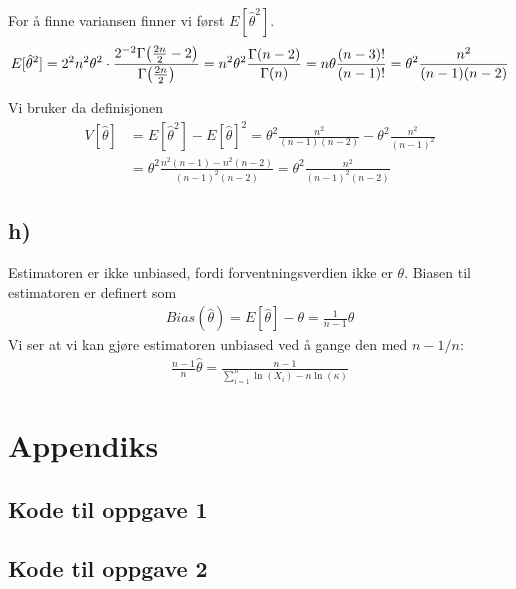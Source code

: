 \documentclass[12p,a4paper]{article}
\begin{document}
For å finne variansen finner vi først $E[\hat{\theta}^2]$.
\begin{align*}
    E[\hat{\theta}^2] = 2^2n^2\theta^2\cdot \frac{2^{-2} \Gamma\qty(\frac{2n}{2} - 2)}{\Gamma\qty(\frac{2n}{2})} = n^2\theta^2\frac{\Gamma\qty(n - 2)}{\Gamma\qty(n)} = n\theta \frac{(n-3)!}{(n-1)!} = \theta^2\frac{n^2}{(n-1)(n-2)}
\end{align*}

Vi bruker da definisjonen
\begin{align*}
    V[\hat{\theta}] &= E[\hat{\theta}^2] - E[\hat{\theta}]^2
    = \theta^2\frac{n^2}{(n-1)(n-2)} - \theta^2\frac{n^2}{(n-1)^2} \\
    &= \theta^2\frac{n^2(n-1) - n^2(n-2)}{(n-1)^2(n-2)} = \theta^2\frac{n^2}{(n-1)^2(n-2)}
\end{align*}



\subsection*{h)}
Estimatoren er ikke unbiased, fordi forventningsverdien ikke er $\theta$. Biasen til estimatoren er definert som
\begin{align*}
    Bias(\hat{\theta}) = E[\hat{\theta}] - \theta = \frac{1}{n-1}\theta
\end{align*}
Vi ser at vi kan gjøre estimatoren unbiased ved å gange den med $n-1/n$:
\begin{align*}
    \frac{n-1}{n}\hat{\theta} = \frac{n-1}{\sum_{i=1}^n\ln(X_i) - n\ln(\kappa)}
\end{align*}




\newpage
\appendix
\section*{Appendiks}
\subsection*{Kode til oppgave 1}

\subsection*{Kode til oppgave 2}

\end{document}
